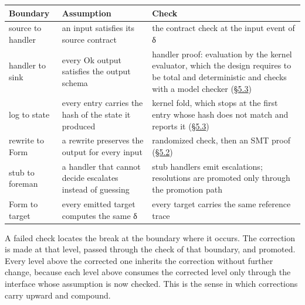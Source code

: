 \documentclass[10pt,letterpaper]{article}
\newcounter{none}
\begin{document}
{\def\LTcaptype{none} %
{\footnotesize\setlength{\tabcolsep}{3.8pt}\renewcommand{\arraystretch}{1.15}
\begin{longtable}[]{@{}
  >{\raggedright\arraybackslash}p{}
  >{\raggedright\arraybackslash}p{}
  >{\raggedright\arraybackslash}p{}@{}}
\toprule\noalign{}
\begin{minipage}[b]{\linewidth}\raggedright
\textbf{Boundary}
\end{minipage} & \begin{minipage}[b]{\linewidth}\raggedright
\textbf{Assumption}
\end{minipage} & \begin{minipage}[b]{\linewidth}\raggedright
\textbf{Check}
\end{minipage} \\
\midrule\noalign{}
\endhead
\bottomrule\noalign{}
\endlastfoot
source to handler & an input satisfies its source contract & the
contract check at the input event of δ \\
handler to sink & every Ok output satisfies the output schema & handler
proof: evaluation by the kernel evaluator, which the design requires to
be total and deterministic and checks with a model checker
(\href{https://research.openie.dev/papers/rce/\#53-model-checking-of-the-kernel}{§5.3}) \\
log to state & every entry carries the hash of the state it produced &
kernel fold, which stops at the first entry whose hash does not match
and reports it
(\href{https://research.openie.dev/papers/rce/\#53-model-checking-of-the-kernel}{§5.3}) \\
rewrite to Form & a rewrite preserves the output for every input &
randomized check, then an SMT proof
(\href{https://research.openie.dev/papers/rce/\#52-the-proof-rule-for-rewrites}{§5.2}) \\
stub to foreman & a handler that cannot decide escalates instead of
guessing & stub handlers emit escalations; resolutions are promoted only
through the promotion path \\
Form to target & every emitted target computes the same δ & every target
carries the same reference trace \\
\end{longtable}
}
}

A failed check locates the break at the boundary where it occurs. The
correction is made at that level, passed through the check of that
boundary, and promoted. Every level above the corrected one inherits the
correction without further change, because each level above consumes the
corrected level only through the interface whose assumption is now
checked. This is the sense in which corrections carry upward and
compound.
\end{document}

